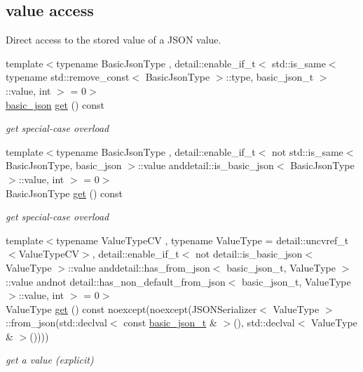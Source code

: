\subsection*{value access}
\label{_amgrpd8f53c9caf18314e5b3f758245606995}%
Direct access to the stored value of a J\+S\+ON value. \begin{DoxyCompactItemize}
\item 
{\footnotesize template$<$typename Basic\+Json\+Type , detail\+::enable\+\_\+if\+\_\+t$<$ std\+::is\+\_\+same$<$ typename std\+::remove\+\_\+const$<$ Basic\+Json\+Type $>$\+::type, basic\+\_\+json\+\_\+t $>$\+::value, int $>$  = 0$>$ }\\\hyperlink{classnlohmann_1_1basic__json}{basic\+\_\+json} \hyperlink{classnlohmann_1_1basic__json_ac41d1fda870c3f3c4ead932c2e3ab61f}{get} () const 
\begin{DoxyCompactList}\small\item\em get special-\/case overload \end{DoxyCompactList}\item 
{\footnotesize template$<$typename Basic\+Json\+Type , detail\+::enable\+\_\+if\+\_\+t$<$ not std\+::is\+\_\+same$<$ Basic\+Json\+Type, basic\+\_\+json $>$\+::value anddetail\+::is\+\_\+basic\+\_\+json$<$ Basic\+Json\+Type $>$\+::value, int $>$  = 0$>$ }\\Basic\+Json\+Type \hyperlink{classnlohmann_1_1basic__json_a217236b89802c0455660a339b73b6969}{get} () const 
\begin{DoxyCompactList}\small\item\em get special-\/case overload \end{DoxyCompactList}\item 
{\footnotesize template$<$typename Value\+Type\+CV , typename Value\+Type  = detail\+::uncvref\+\_\+t$<$\+Value\+Type\+C\+V$>$, detail\+::enable\+\_\+if\+\_\+t$<$ not detail\+::is\+\_\+basic\+\_\+json$<$ Value\+Type $>$\+::value anddetail\+::has\+\_\+from\+\_\+json$<$ basic\+\_\+json\+\_\+t, Value\+Type $>$\+::value andnot detail\+::has\+\_\+non\+\_\+default\+\_\+from\+\_\+json$<$ basic\+\_\+json\+\_\+t, Value\+Type $>$\+::value, int $>$  = 0$>$ }\\Value\+Type \hyperlink{classnlohmann_1_1basic__json_aa6602bb24022183ab989439e19345d08}{get} () const noexcept(noexcept(J\+S\+O\+N\+Serializer$<$ Value\+Type $>$\+::from\+\_\+json(std\+::declval$<$ const \hyperlink{classnlohmann_1_1basic__json_afff7860310ae69f29f8158a77ec0ef13}{basic\+\_\+json\+\_\+t} \& $>$(), std\+::declval$<$ Value\+Type \& $>$())))
\begin{DoxyCompactList}\small\item\em get a value (explicit) \end{DoxyCompactList}\item 

\end{DoxyCompactItemize}
